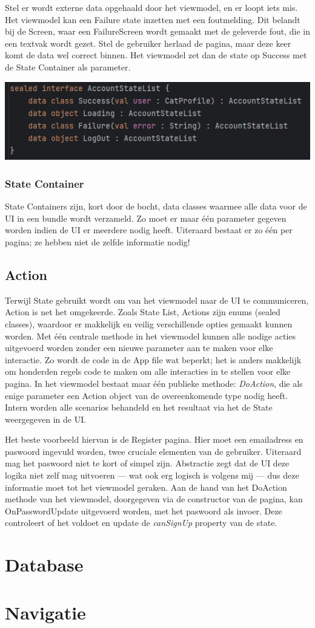 \documentclass{report}
\begin{document}
Stel er wordt externe data opgehaald door het viewmodel, en er loopt iets mis. Het viewmodel kan een Failure state inzetten met een foutmelding.
Dit belandt bij de Screen, waar een FailureScreen wordt gemaakt met de geleverde fout, die in een textvak wordt gezet.
Stel de gebruiker herlaad de pagina, maar deze keer komt de data wel correct binnen. Het viewmodel zet dan de state op Success met de State Container als parameter.

\begin{center}
    \includegraphics{VM_State}
\end{center}

\subsubsection{State Container}
State Containers zijn, kort door de bocht, data classes waarmee alle data voor de UI in een bundle wordt verzameld.
Zo moet er maar één parameter gegeven worden indien de UI er meerdere nodig heeft.
Uiteraard bestaat er zo één per pagina; ze hebben niet de zelfde informatie nodig!



\subsection{Action}
Terwijl State gebruikt wordt om van het viewmodel naar de UI te communiceren, Action is net het omgekeerde.
Zoals State List, Actions zijn enums (sealed classes), waardoor er makkelijk en veilig verschillende opties gemaakt kunnen worden.
Met één centrale methode in het viewmodel kunnen alle nodige acties uitgevoerd worden zonder een nieuwe parameter aan te maken voor elke interactie.
Zo wordt de code in de App file wat beperkt; het is anders makkelijk om honderden regels code te maken om alle interacties in te stellen voor elke pagina.
In het viewmodel bestaat maar één publieke methode: \textit{DoAction}, die als enige parameter een Action object van de overeenkomende type nodig heeft.
Intern worden alle scenarios behandeld en het resultaat via het de State weergegeven in de UI. 

Het beste voorbeeld hiervan is de Register pagina. Hier moet een emailadress en paswoord ingevuld worden, twee cruciale elementen van de gebruiker.
Uiteraard mag het paswoord niet te kort of simpel zijn.
Abstractie zegt dat de UI deze logika niet zelf mag uitvoeren --- wat ook erg logisch is volgens mij --- dus deze informatie moet tot het viewmodel geraken.
Aan de hand van het DoAction methode van het viewmodel, doorgegeven via de constructor van de pagina, kan OnPasswordUpdate uitgevoerd worden, met het paswoord als invoer.
Deze controleert of het voldoet en update de \textit{canSignUp} property van de state.



\section{Database}

\section{Navigatie}
\end{document}
